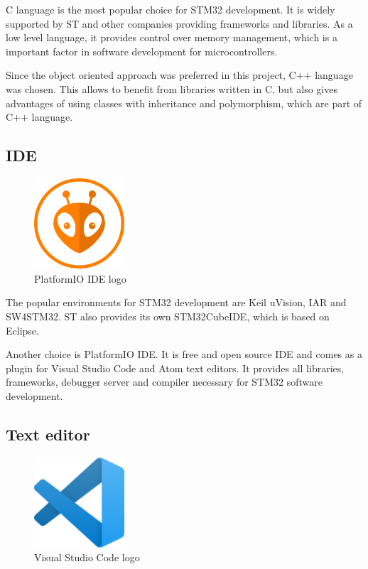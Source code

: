 \documentclass[a4paper,twoside,12pt]{book}
\begin{document}
C language is the most popular choice for STM32 development.
It is widely supported by ST and other companies providing frameworks and libraries.
As a low level language, it provides control over memory management,
which is a important factor in software development for microcontrollers.

Since the object oriented approach was preferred in this project,
C++ language was chosen.
This allows to benefit from libraries written in C,
but also gives advantages of using classes with inheritance and polymorphism,
which are part of C++ language.

\subsection{IDE}

\begin{figure}[H]
    \centering
    \includegraphics[width=0.3\textwidth]{images/platformio-logo}
    \caption{PlatformIO IDE logo}
    \label{fig:plaftormio}
\end{figure}

The popular environments for STM32 development are Keil uVision, IAR and SW4STM32.
ST also provides its own STM32CubeIDE, which is based on Eclipse.

Another choice is PlatformIO IDE.
It is free and open source IDE and
comes as a plugin for Visual Studio Code and Atom text editors.
It provides all libraries, frameworks,
debugger server and compiler necessary for STM32 software development.

\subsection{Text editor}
\begin{figure}[H]
    \centering
    \includegraphics[width=0.3\textwidth]{images/vscode}
    \caption{Visual Studio Code logo}
    \label{fig:vscode}
\end{figure}
\end{document}
